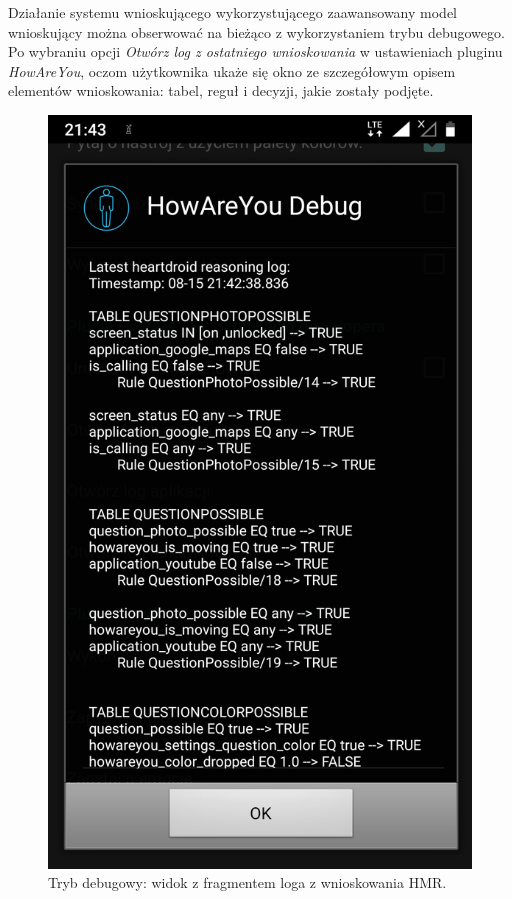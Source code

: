 Działanie systemu wnioskującego wykorzystującego zaawansowany model wnioskujący można obserwować na bieżąco z wykorzystaniem trybu debugowego. Po wybraniu opcji \textit{Otwórz log z ostatniego wnioskowania} w ustawieniach pluginu \textit{HowAreYou}, oczom użytkownika ukaże się okno ze szczegółowym opisem elementów wnioskowania: tabel, reguł i decyzji, jakie zostały podjęte.

\begin{figure}[H]
	\centering
	\includegraphics[scale=0.15]{rozdzial4/HMR_screenshots_A.png}
	\caption{Tryb debugowy: widok z fragmentem loga z wnioskowania HMR.}
\end{figure}



